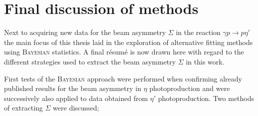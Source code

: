 \section{Final discussion of methods}
Next to acquiring new data for the beam asymmetry $\Sigma$ in the reaction $\gamma p\to p\eta'$ the main focus of this thesis laid in the exploration of alternative fitting methods using \textsc{Bayesian} statistics. A final r\'{e}sum\'{e} is now drawn here with regard to the different strategies used to extract the beam asymmetry $\Sigma$ in this work.

First tests of the \textsc{Bayesian} approach were performed when confirming already published results for the beam asymmetry in $\eta$ photoproduction \cite{farahphd,eta} and were successively also applied to data obtained from $\eta'$ photoproduction. Two methods of extracting $\Sigma$ were discussed;

